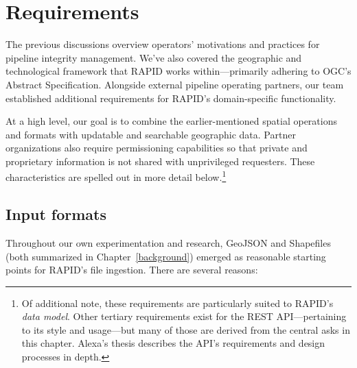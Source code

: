 \chapter{Requirements}
\label{requirements}

The previous discussions overview operators' motivations and practices for pipeline integrity management. We've also covered the geographic and technological framework that RAPID works within---primarily adhering to OGC's Abstract Specification. Alongside external pipeline operating partners, our team established additional requirements for RAPID's domain-specific functionality.

At a high level, our goal is to combine the earlier-mentioned spatial operations and formats with updatable and searchable  geographic data. Partner organizations also require permissioning capabilities so that private and proprietary information is not shared with unprivileged requesters. These characteristics are spelled out in more detail below.\footnote{Of additional note, these requirements are particularly suited to RAPID's \textit{data model}. Other tertiary requirements exist for the REST API---pertaining to its style and usage---but many of those are derived from the central asks in this chapter. Alexa's thesis describes the API's requirements and design processes in depth.}

\section{Input formats}

Throughout our own experimentation and research, GeoJSON and Shapefiles (both summarized in Chapter~\ref{background}) emerged as reasonable starting points for RAPID's file ingestion. There are several reasons:

